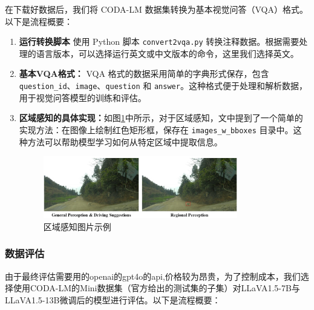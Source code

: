 \documentclass[
    linespread = 1.25
]{ctexart}
\begin{document}
在下载好数据后，我们将 CODA-LM 数据集转换为基本视觉问答（VQA）格式。以下是流程概要：

\begin{enumerate}
  \item \textbf{运行转换脚本}
        使用 Python 脚本 \texttt{convert2vqa.py} 转换注释数据。根据需要处理的语言版本，可以选择运行英文或中文版本的命令，这里我们选择英文。

  \item \textbf{基本VQA格式：}
        VQA 格式的数据采用简单的字典形式保存，包含 \texttt{question\_id}、\texttt{image}、\texttt{question} 和 \texttt{answer}。这种格式便于处理和解析数据，用于视觉问答模型的训练和评估。


  \item \textbf{区域感知的具体实现：}如图\ref{fig:example}中所示，对于区域感知，文中提到了一个简单的实现方法：在图像上绘制红色矩形框，保存在 \texttt{images\_w\_bboxes} 目录中。这种方法可以帮助模型学习如何从特定区域中提取信息。

        \begin{figure}[h] %
          \centering %
          \includegraphics[width=0.8\textwidth]{visual.png} %
          \caption{区域感知图片示例} %
          \label{fig:example} %
        \end{figure}
\end{enumerate}

\subsubsection{数据评估}
由于最终评估需要用的openai的gpt4o的api,价格较为昂贵，为了控制成本，我们选择使用CODA-LM的Mini数据集（官方给出的测试集的子集）对LLaVA1.5-7B与LLaVA1.5-13B微调后的模型进行评估。以下是流程概要：
\end{document}
